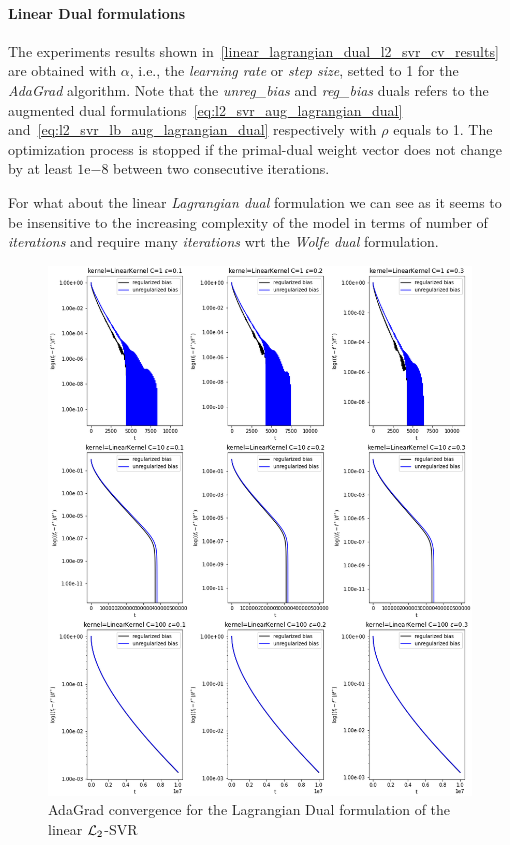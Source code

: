 \paragraph{Linear Dual formulations}

The experiments results shown in~\ref{linear_lagrangian_dual_l2_svr_cv_results} are obtained with $\alpha$, i.e., the \emph{learning rate} or \emph{step size}, setted to 1 for the \emph{AdaGrad} algorithm. Note that the \emph{unreg\_bias} and \emph{reg\_bias} duals refers to the augmented dual formulations~\eqref{eq:l2_svr_aug_lagrangian_dual} and~\eqref{eq:l2_svr_lb_aug_lagrangian_dual} respectively with $\rho$ equals to 1. The optimization process is stopped if the primal-dual weight vector does not change by at least $1\mathrm{e}{-8}$  between two consecutive iterations.



For what about the linear \emph{Lagrangian dual} formulation we can see as it seems to be insensitive to the increasing complexity of the model in terms of number of \emph{iterations} and require many \emph{iterations} wrt the \emph{Wolfe dual} formulation.

\begin{figure}[H]
	\centering
	\includegraphics[scale=0.55]{img/linear_lagrangian_dual_l2_svr_loss_history}
	\caption{AdaGrad convergence for the Lagrangian Dual formulation of the linear $\protect \mathcal{L}_2$-SVR}
	\label{fig:linear_lagrangian_dual_l2_svr_loss_history}
\end{figure}

